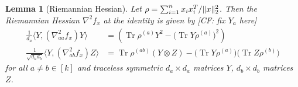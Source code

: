 \documentclass{article}
\newtheorem{lemma}[theorem]{Lemma}
\DeclarePairedDelimiter{\norm}{\lVert}{\rVert}
\newcommand{\ot}{\otimes}
\newcommand\samp{x}
\newcommand\tr{\operatorname{Tr}}
\newcommand{\CF}[1]{{\color{purple}[CF: #1]}}
\begin{document}
\begin{lemma}[Riemannian Hessian]\label{lem:hessian}
Let $\rho = \sum_{i=1}^n \samp_i \samp_i^T / \norm{\samp}_2^2$.
Then the Riemannian Hessian $\nabla^2 f_{\samp}$ at the identity is given by \CF{fix $Y_a$ here}
\begin{align*}
 \frac{1}{d_a} \langle Y,  \left( \nabla^2_{aa} f_{\samp} \right) Y \rangle
&= \left( \tr \rho^{(a)} Y^2 - \bigl(\tr Y \rho^{(a)}\bigr)^2 \right) \\
  \frac1{\sqrt{d_a d_b}} \langle Y,  \left( \nabla^2_{ab} f_{\samp} \right) Z \rangle
&= \tr \rho^{(ab)} \left( Y \ot Z \right) - \bigl(\tr Y \rho^{(a)}\bigr)\bigl(\tr Z \rho^{(b)}\bigr) 
\end{align*}
for all $a\neq b\in[k]$ and traceless symmetric $d_a\times d_a$ matrices $Y$, $d_b\times d_b$ matrices~$Z$.
\end{lemma}
\end{document}
